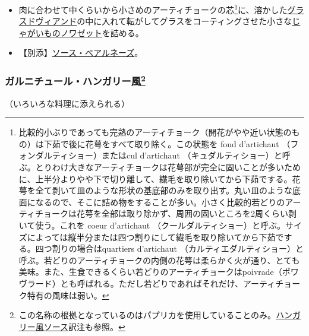 \begin{recette}
\begin{itemize}
\item
  肉に合わせて中くらいから小さめのアーティチョークの芯\footnote{比較的小ぶりであっても完熟のアーティチョーク（開花がやや近い状態のもの）は下茹で後に花萼をすべて取り除く。この状態を
    fond d'artichaut （フォンダルティショー）またはcul d'artichaut
    （キュダルティショー）と呼ぶ。とりわけ大きなアーティチョークは花萼部が完全に固いことが多いために、上半分よりやや下で切り離して、繊毛を取り除いてから下茹でする。花萼を全て剥いて皿のような形状の基底部のみを取り出す。丸い皿のような底面になるので、そこに詰め物をすることが多い。小さく比較的若どりのアーティチョークは花萼を全部は取り除かず、周囲の固いところを2周くらい剥いて使う。これを
    coeur d'artichaut
    （クールダルティショー）と呼ぶ。サイズによっては縦半分または四つ割りにして繊毛を取り除いてから下茹でする。四つ割りの場合はquartiers
    d'artichaut
    （カルティエダルティショー）と呼ぶ。若どりのアーティチョークの内側の花萼は柔らかく火が通り、とても美味。また、生食できるくらい若どりのアーティチョークはpoivrade（ポワヴラード）とも呼ばれる。ただし若どりであればそれだけ、アーティチョーク特有の風味は弱い。}に、溶かした\protect\hyperlink{glace-de-viande}{グラスドヴィアンド}の中に入れて転がしてグラスをコーティングさせた小さな\protect\hyperlink{pommes-de-terre-noisette}{じゃがいものノワゼット}を詰める。
\item
  【別添】\protect\hyperlink{sauce-bearnaise}{ソース・ベアルネーズ}。
\end{itemize}

\atoaki{}

\hypertarget{garniture-a-la-hongroise}{%
\subsubsection[ガルニチュール・ハンガリー風]{\texorpdfstring{ガルニチュール・ハンガリー風\footnote{この名称の根拠となっているのはパプリカを使用していることのみ。\protect\hyperlink{sauce-hongroise}{ハンガリー風ソース}訳注も参照。}}{ガルニチュール・ハンガリー風}}\label{garniture-a-la-hongroise}}



（いろいろな料理に添えられる）


\end{recette}
